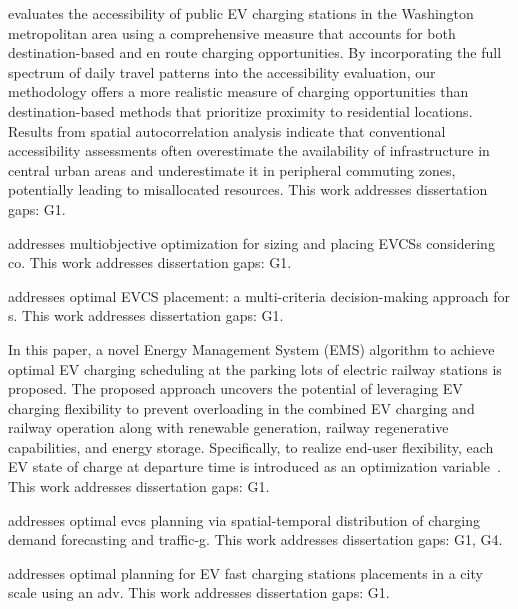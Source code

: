 \documentclass[letterpaper, 12pt, oneside, doublespacing]{Thesis}
\begin{document}
\noindent \cite{integrating_en_2024} evaluates the accessibility of public EV charging stations in the Washington metropolitan area using a comprehensive measure that accounts for both destination-based and en route charging opportunities. By incorporating the full spectrum of daily travel patterns into the accessibility evaluation, our methodology offers a more realistic measure of charging opportunities than destination-based methods that prioritize proximity to residential locations. Results from spatial autocorrelation analysis indicate that conventional accessibility assessments often overestimate the availability of infrastructure in central urban areas and underestimate it in peripheral commuting zones, potentially leading to misallocated resources. This work addresses dissertation gaps: G1.



\noindent \cite{multiobjective_optimization_2024} addresses multiobjective optimization for sizing and placing EVCSs considering co. This work addresses dissertation gaps: G1.



\noindent \cite{optimal_electric_2024} addresses optimal EVCS placement: a multi-criteria decision-making approach for s. This work addresses dissertation gaps: G1.



\noindent In this paper, a novel Energy Management System (EMS) algorithm to achieve optimal EV charging scheduling at the parking lots of electric railway stations is proposed. The proposed approach uncovers the potential of leveraging EV charging flexibility to prevent overloading in the combined EV charging and railway operation along with renewable generation, railway regenerative capabilities, and energy storage. Specifically, to realize end-user flexibility, each EV state of charge at departure time is introduced as an optimization variable~\cite{optimal_ev_2024}. This work addresses dissertation gaps: G1.



\noindent \cite{optimal_evcs_2024} addresses optimal evcs planning via spatial-temporal distribution of charging demand forecasting and traffic-g. This work addresses dissertation gaps: G1, G4.



\noindent \cite{optimal_planning_2024} addresses optimal planning for EV fast charging stations placements in a city scale using an adv. This work addresses dissertation gaps: G1.
\end{document}
